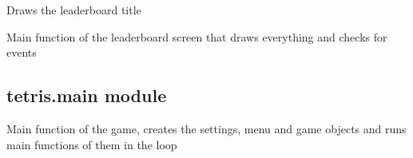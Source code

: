 \documentclass[letterpaper,10pt,english]{sphinxmanual}
\begin{document}
\begin{fulllineitems}
\begin{fulllineitems}
\end{fulllineitems}


\begin{fulllineitems}
\label{\detokenize{tetris.leaderboard:tetris.leaderboard.Leaderboard.draw_title}}
\pysigstartsignatures
{}
\pysigstopsignatures
\sphinxAtStartPar
Draws the leaderboard title

\end{fulllineitems}


\begin{fulllineitems}
\label{\detokenize{tetris.leaderboard:tetris.leaderboard.Leaderboard.main}}
\pysigstartsignatures
{}
\pysigstopsignatures
\sphinxAtStartPar
Main function of the leaderboard screen that draws everything and checks for events

\end{fulllineitems}


\end{fulllineitems}


\sphinxstepscope


\subsection{tetris.main module}
\label{\detokenize{tetris.main:module-tetris.main}}\label{\detokenize{tetris.main:tetris-main-module}}\label{\detokenize{tetris.main::doc}}

\begin{fulllineitems}
\label{\detokenize{tetris.main:tetris.main.main}}
\pysigstartsignatures
{}
\pysigstopsignatures
\sphinxAtStartPar
Main function of the game, creates the settings, menu and game objects and runs main functions of them in the loop

\end{fulllineitems}
\end{document}
